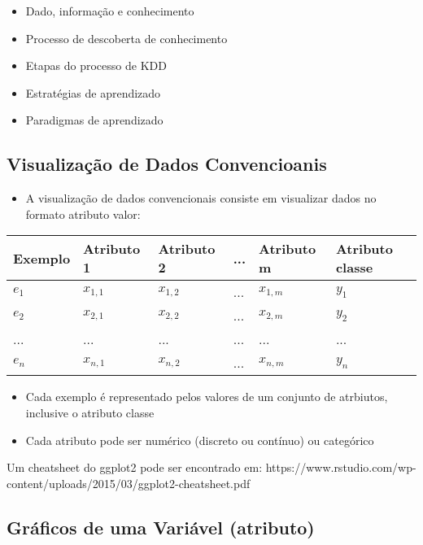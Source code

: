 \documentclass[11pt]{article}
\providecommand{\tightlist}{%
      \setlength{\itemsep}{0pt}\setlength{\parskip}{0pt}}
\begin{document}
\begin{itemize}
\item
  Dado, informação e conhecimento
\item
  Processo de descoberta de conhecimento
\item
  Etapas do processo de KDD
\item
  Estratégias de aprendizado
\item
  Paradigmas de aprendizado
\end{itemize}

    \subsection{Visualização de Dados
Convencioanis}\label{visualizauxe7uxe3o-de-dados-convencioanis}

\begin{itemize}
\tightlist
\item
  A visualização de dados convencionais consiste em visualizar dados no
  formato atributo valor:
\end{itemize}

\begin{longtable}[]{@{}llllll@{}}
\toprule
Exemplo & Atributo 1 & Atributo 2 & ... & Atributo m & Atributo
classe\tabularnewline
\midrule
\endhead
\(e_1\) & \(x_{1,1}\) & \(x_{1,2}\) & ... & \(x_{1,m}\) &
\(y_1\)\tabularnewline
\(e_2\) & \(x_{2,1}\) & \(x_{2,2}\) & ... & \(x_{2,m}\) &
\(y_2\)\tabularnewline
... & ... & ... & ... & ... & ...\tabularnewline
\(e_n\) & \(x_{n,1}\) & \(x_{n,2}\) & ... & \(x_{n,m}\) &
\(y_n\)\tabularnewline
\bottomrule
\end{longtable}

\begin{itemize}
\tightlist
\item
  Cada exemplo é representado pelos valores de um conjunto de atrbiutos,
  inclusive o atributo classe
\item
  Cada atributo pode ser numérico (discreto ou contínuo) ou categórico
\end{itemize}

    Um cheatsheet do ggplot2 pode ser encontrado em:
https://www.rstudio.com/wp-content/uploads/2015/03/ggplot2-cheatsheet.pdf

    \subsection{Gráficos de uma Variável
(atributo)}\label{gruxe1ficos-de-uma-variuxe1vel-atributo}
\end{document}
